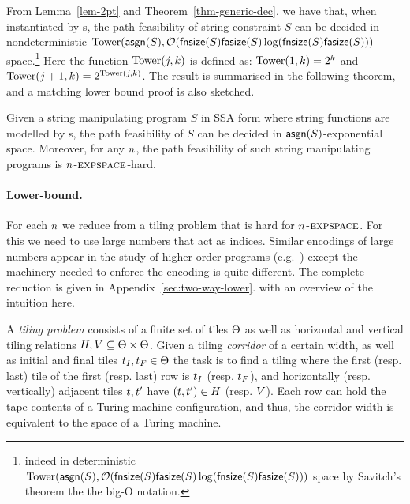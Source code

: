 From Lemma~\ref{lem-2pt} and Theorem~\ref{thm-generic-dec}, %
we have that, when instantiated by \PPT{}s, %
the path feasibility of string constraint $S$ can be decided in 
nondeterministic $\mathrm{Tower}(\mathsf{asgn}(S), \mathcal{O}(\mathsf{fnsize}(S) \mathsf{fasize}(S) \log(\mathsf{fnsize}(S) \mathsf{fasize}(S)))$ space.\footnote{indeed in deterministic $\mathrm{Tower}(\mathsf{asgn}(S), \mathcal{O}(\mathsf{fnsize}(S) \mathsf{fasize}(S) \log(\mathsf{fnsize}(S) \mathsf{fasize}(S)))$ space by Savitch's theorem \cite{Savitch70} the the big-O notation.} Here the function $\mathrm{Tower}(j, k)$ is %
defined as: $\mathrm{Tower}(1, k)= 2^k$ and $\mathrm{Tower}(j+1, k) = 2^{\mathrm{Tower}(j, k)}$. 
The result is summarised in the following theorem, and a matching lower bound proof is also sketched.
%
\begin{theorem} \label{thm:two-way}
Given a string manipulating program $S$ in SSA form where string functions are modelled by \PPT{}s, the path feasibility of $S$ can be decided in $\mathsf{asgn}(S)$-exponential space. Moreover,  for any $n$, the path feasibility of such string manipulating programs is  %
 $n$-$\textsc{expspace}$-hard.
\end{theorem}

\paragraph{Lower-bound.}

For each $n$ we reduce from a tiling problem that is hard for $n$-$\textsc{expspace}$.
For this we need to use large numbers that act as indices.
Similar encodings of large numbers appear in the study of higher-order programs (e.g.~\cite{J01,CW07}) except the machinery needed to enforce the encoding is quite different.
The complete reduction is given in 
          {Appendix~\ref{sec:two-way-lower}}.
with an overview of the intuition here.

A \emph{tiling problem} consists of a finite set of tiles $\Theta$ as well as horizontal and vertical tiling relations 
$H, V \subseteq \Theta \times \Theta$.
Given a tiling \emph{corridor} of a certain width, as well as initial and final tiles
$t_I, t_F \in \Theta$
the task is to find a tiling where the first (resp. last) tile of the first (resp. last) row is $t_I$ (resp. $t_F$), and horizontally (resp. vertically) adjacent tiles $t, t'$ have
$\left( t, t' \right) \in H$
(resp. $V$).
Each row can hold the tape contents of a Turing machine configuration, and thus, the corridor width is equivalent to the space of a Turing machine.

